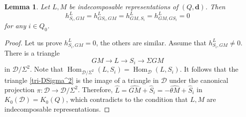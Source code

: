 \documentclass[12pt,reqno]{amsart}
\numberwithin{equation}{section}
\renewcommand{\mod}{\operatorname{mod}\nolimits}
\newcommand{\Hom}{\operatorname{Hom}\nolimits}
\newcommand{\go}{{K_0}}
\newtheorem{lemma}[theorem]{Lemma}
\begin{document}
	
	
	
	
	
	
	\begin{lemma}\label{lem:hall-number-root-cat-zero}
		Let $L,M$ be indecomposable representations of $(Q,\mathbf{d})$. Then \[h_{S_i,GM}^L=h_{GS_i,GM}^L=h_{GM,S_i}^L=h_{GM,GS_i}^L=0\] for any $i\in Q_0$.
	\end{lemma}
	\begin{proof}
		Let us prove $h_{S_i,GM}^L=0$, the others are similar. Assume that $h_{S_i,GM}^L\neq 0$. There is a triangle 
		\begin{equation}\label{tri-DSigma^2}
			GM\longrightarrow L\longrightarrow S_i\longrightarrow \Sigma GM
		\end{equation}
		in $\mathcal{D}/\Sigma^2$. Note that $\Hom_{\mathcal{D}/\Sigma^2}(L,S_i)=\Hom_\mathcal{D}(L, S_{i})$. It follows that the triangle \eqref{tri-DSigma^2} is the image of a triangle in $\mathcal{D}$ under the canonical projection $\pi:\mathcal{D}\rightarrow \mathcal{D}/\Sigma^2$. Therefore, $\hat{L}=\hat{GM}+\hat{S}_i=-\hat{\theta M}+\hat{S}_i$ in $\go(\mathcal{D})=\go(Q)$, which contradicts to the condition that $L,M$ are indecomposable representations.
	\end{proof}
	
	
	
\end{document}

